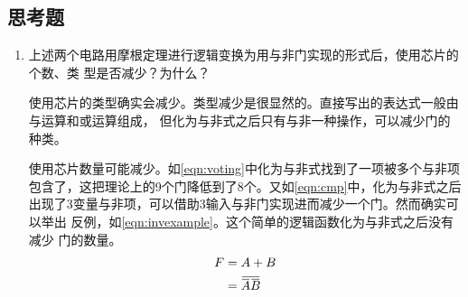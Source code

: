 \documentclass[a4paper,twoside]{ctexart}
\newcommand{\ols}[1]{\mskip.5\thinmuskip\overline{\mskip-.5\thinmuskip {#1} \mskip-.5\thinmuskip}\mskip.5\thinmuskip}
\begin{document}
\begin{spacing}{1.2}
\section{思考题}

\begin{enumerate}
	\item 上述两个电路用摩根定理进行逻辑变换为用与非门实现的形式后，使用芯片的个数、类
	型是否减少？为什么？

	使用芯片的类型确实会减少。类型减少是很显然的。直接写出的表达式一般由与运算和或运算组成，
	但化为与非式之后只有与非一种操作，可以减少门的种类。
	
	使用芯片数量可能减少。如\eqref{eqn:voting}中化为与非式找到了一项被多个与非项
	包含了，这把理论上的9个门降低到了8个。又如\eqref{eqn:cmp}中，化为与非式之后
	出现了3变量与非项，可以借助3输入与非门实现进而减少一个门。然而确实可以举出
	反例，如\eqref{eqn:invexample}。这个简单的逻辑函数化为与非式之后没有减少
	门的数量。
	\begin{equation}
		\label{eqn:invexample}
		\begin{aligned}
			F&=A+B\\
			&=\ols{\ols{A}\ols{B}}
		\end{aligned}
	\end{equation}
\end{enumerate}

\end{spacing}
\end{document}
